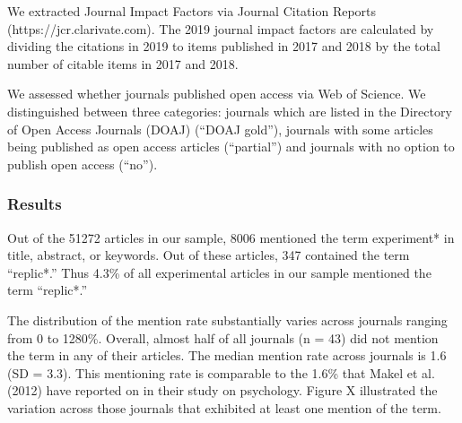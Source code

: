 \documentclass[]{elsarticle} %
\begin{document}
We extracted Journal Impact Factors via Journal Citation Reports
(https://jcr.clarivate.com). The 2019 journal impact factors are
calculated by dividing the citations in 2019 to items published in 2017
and 2018 by the total number of citable items in 2017 and 2018.

We assessed whether journals published open access via Web of Science.
We distinguished between three categories: journals which are listed in
the Directory of Open Access Journals (DOAJ) (``DOAJ gold''), journals
with some articles being published as open access articles (``partial'')
and journals with no option to publish open access (``no'').

\hypertarget{results}{%
\subsubsection{Results}\label{results}}

Out of the 51272 articles in our sample, 8006 mentioned the term
experiment* in title, abstract, or keywords. Out of these articles, 347
contained the term ``replic*.'' Thus 4.3\% of all experimental articles
in our sample mentioned the term ``replic*.''

The distribution of the mention rate substantially varies across
journals ranging from 0 to 1280\%. Overall, almost half of all journals
(n = 43) did not mention the term in any of their articles. The median
mention rate across journals is 1.6 (SD = 3.3). This mentioning rate is
comparable to the 1.6\% that Makel et al. (2012) have reported on in
their study on psychology. Figure X illustrated the variation across
those journals that exhibited at least one mention of the term.
\end{document}
